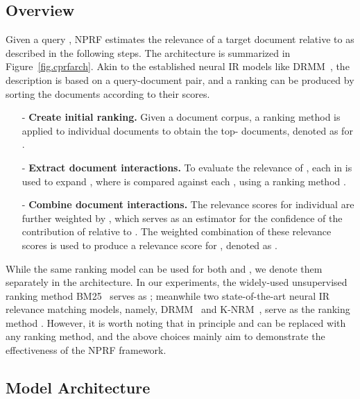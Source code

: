 \documentclass[11pt,a4paper]{article}
\begin{document}
\vspace{\vignore}
\subsection{Overview}\label{sec.methodoverview}
\vspace{\vignore}


Given a query , NPRF estimates the relevance of a target document  relative to  as described in the following steps. The architecture is summarized in Figure~\ref{fig.cprfarch}.
Akin to the established neural IR models like DRMM~\cite{DBLP:conf/cikm/GuoFAC16},
the description is based on a query-document pair,
and a ranking can be produced by sorting the documents according to their scores. 


\begin{enumerate}[leftmargin=*]
\item[-]  
\noindent \textbf{Create initial ranking.} 
Given a document corpus,
a ranking method  is applied to
individual documents to obtain the top- documents,
denoted as  for .

\item[-] 
\noindent \textbf{Extract document interactions.} To evaluate the 
relevance of , 
each  in 
is used to expand , where  is compared against
each , using a ranking method .

\item[-] 
\noindent \textbf{Combine document interactions.} The relevance scores  for
individual  are further weighted by , which serves as an estimator for  
the confidence of the contribution of  relative to .
The weighted combination of these relevance scores is used to produce
a relevance score for , denoted as .
\end{enumerate}


While the same ranking model can be used for both  and , we denote them separately in the architecture.
In our experiments, the widely-used unsupervised ranking method
BM25~\cite{DBLP:conf/trec/RobertsonWHGP95} serves as ;
meanwhile
two state-of-the-art neural IR relevance matching models, namely,
DRMM~\cite{DBLP:conf/cikm/GuoFAC16} and K-NRM~\cite{DBLP:conf/sigir/XiongDCLP17},
serve as the ranking method .
However, it is worth noting that in principle
 and  can be replaced with any ranking method,
and the above choices mainly aim to demonstrate the effectiveness of the NPRF framework.

\vspace{\vignore}
\subsection{Model Architecture}\label{sec.architecture}
\vspace{\vignore}
\end{document}
